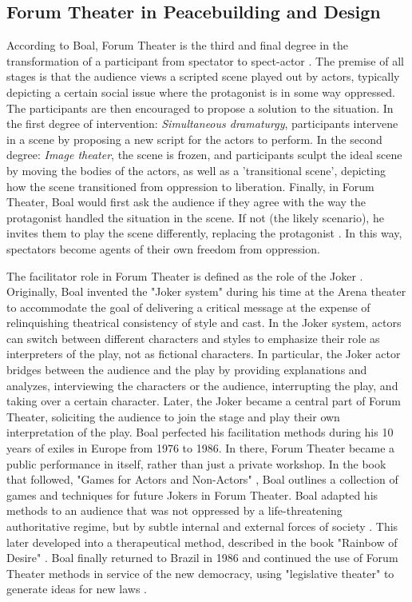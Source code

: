 \documentclass[dissertation,math,vertlayout,pdfa,colorlinks]{aaltoseries}
\begin{document}
\subsection{Forum Theater in Peacebuilding and Design}
According to Boal, Forum Theater is the third and final degree in the transformation of a participant from spectator to spect-actor \cite{boalTheatreOppressed2008}. The premise of all stages is that the audience views a scripted scene played out by actors, typically depicting a certain social issue where the protagonist is in some way oppressed. The participants are then encouraged to propose a solution to the situation. In the first degree of intervention: \textit{Simultaneous dramaturgy}, participants intervene in a scene by proposing a new script for the actors to perform. In the second degree: \textit{Image theater}, the scene is frozen, and participants sculpt the ideal scene by moving the bodies of the actors, as well as a 'transitional scene', depicting how the scene transitioned from oppression to liberation. Finally, in Forum Theater, Boal would first ask the audience if they agree with the way the protagonist handled the situation in the scene. If not (the likely scenario), he invites them to play the scene differently, replacing the protagonist \cite{friedmanPerformanceActivismPrecursors2021, cohen-cruzBoalCompanionDialogues2006}. In this way, spectators become agents of their own freedom from oppression. 

The facilitator role in Forum Theater is defined as the role of the Joker \cite{boalTheatreOppressed2008}. Originally, Boal invented the "Joker system" during his time at the Arena theater to accommodate the goal of delivering a critical message at the expense of relinquishing theatrical consistency of style and cast. In the Joker system, actors can switch between different characters and styles to emphasize their role as interpreters of the play, not as fictional characters. In particular, the Joker actor bridges between the audience and the play by providing explanations and analyzes, interviewing the characters or the audience, interrupting the play, and taking over a certain character. Later, the Joker became a central part of Forum Theater, soliciting the audience to join the stage and play their own interpretation of the play. Boal perfected his facilitation methods during his 10 years of exiles in Europe from 1976 to 1986. In there, Forum Theater became a public performance in itself, rather than just a private workshop. In the book that followed, "Games for Actors and Non-Actors" \cite{boalGamesActorsNonActors2021}, Boal outlines a collection of games and techniques for future Jokers in Forum Theater. Boal adapted his methods to an audience that was not oppressed by a life-threatening authoritative regime, but by subtle internal and external forces of society \cite{cohen-cruzBoalCompanionDialogues2006}. This later developed into a therapeutical method, described in the book "Rainbow of Desire" \cite{boalRainbowDesireBoal2013}. Boal finally returned to Brazil in 1986 and continued the use of Forum Theater methods in service of the new democracy, using "legislative theater" to generate ideas for new laws \cite{cohen-cruzBoalCompanionDialogues2006}.
\end{document}
